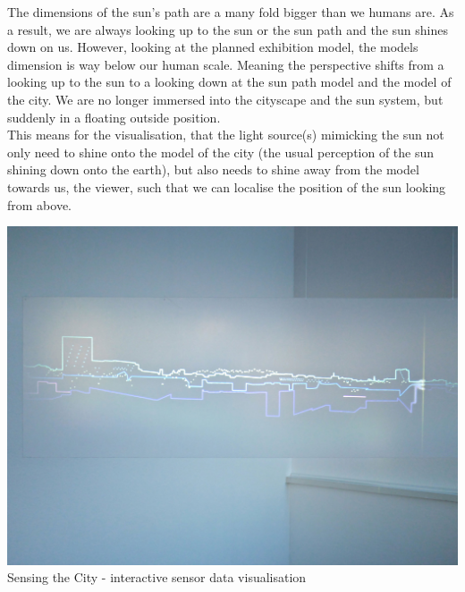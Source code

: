 \documentclass[a4paper,9pt]{article}
\begin{document}
\begin{multicols}{2}
The dimensions of the sun's path are a many fold bigger than we humans are. As a result, we are always looking up to the sun or the sun path and the sun shines down on us. However, looking at the planned exhibition model, the models dimension is way below our human scale. Meaning the perspective shifts from a looking up to the sun to a looking down at the sun path model and the model of the city. We are no longer immersed into the cityscape and the sun system, but suddenly in a floating outside position.\\
This means for the visualisation, that the light source(s) mimicking the sun not only need to shine onto the model of the city (the usual perception of the sun shining down onto the earth), but also needs to shine away from the model towards us, the viewer, such that we can localise the position of the sun looking from above.
\end{multicols}
\begin{minipage}{0.48\linewidth}
        \centering
        \includegraphics[width=.9\linewidth]{Images/sensing30.jpg}
      \\{Sensing the City - interactive sensor data visualisation \footnotemark }
    

    \end{minipage}
    \hfill
\end{document}
